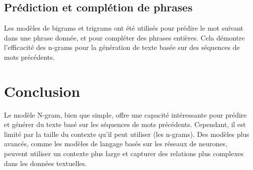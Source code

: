 \subsection{Prédiction et complétion de phrases}

Les modèles de bigrams et trigrams ont été utilisés pour prédire le mot suivant dans une phrase donnée, et pour compléter des phrases entières. Cela démontre l'efficacité des n-grams pour la génération de texte basée sur des séquences de mots précédents.



\section{Conclusion}

Le modèle N-gram, bien que simple, offre une capacité intéressante pour prédire et générer du texte basé sur les séquences de mots précédents. Cependant, il est limité par la taille du contexte qu'il peut utiliser (les n-grams). Des modèles plus avancés, comme les modèles de langage basés sur les réseaux de neurones, peuvent utiliser un contexte plus large et capturer des relations plus complexes dans les données textuelles.